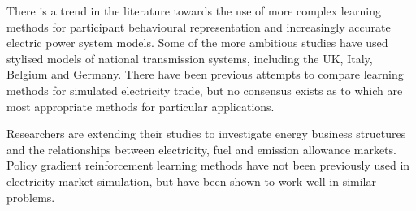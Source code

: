 There is a trend in the literature towards the use of more complex learning
methods for participant behavioural representation and increasingly accurate
electric power system models.  Some of the more ambitious studies have used
stylised models of national transmission systems, including the
UK, Italy, Belgium and Germany.  There have been previous attempts to compare
learning methods for simulated electricity trade, but no consensus exists as
to which are most appropriate methods for particular applications.

Researchers are extending their studies to investigate energy business
structures and the relationships between electricity, fuel and emission
allowance markets.  Policy gradient reinforcement learning methods have not been
previously used in electricity market simulation, but have been shown to work
well in similar problems.
